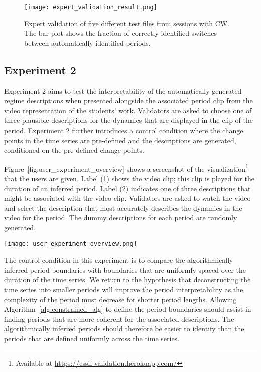 \begin{figure}
\centering
\texttt{[image: expert\_validation\_result.png]}
\caption{Expert validation of five different test files from sessions with CW. The bar plot shows the fraction of correctly identified switches between automatically identified periods.}
\label{fig:results_expert_validation}
\end{figure}

\subsection{Experiment 2}\label{sec:experiment2-empirical-validation}

Experiment 2 aims to test the interpretability of the automatically generated regime descriptions when presented alongside the associated period clip from the video representation of the students' work. Validators are asked to choose one of three plausible descriptions for the dynamics that are displayed in the clip of the period. Experiment 2 further introduces a control condition where the change points in the time series are pre-defined and the descriptions are generated, conditioned on the pre-defined change points.

Figure~\ref{fig:user_experiment_overview} shows a screenshot of the visualization\footnote{Available at \url{https://essil-validation.herokuapp.com/}} that the users are given. Label (1) shows the video clip; this clip is played for the duration of an inferred period. Label (2) indicates one of three descriptions that might be associated with the video clip. Validators are asked to watch the video and select the description that most accurately describes the dynamics in the video for the period. The dummy descriptions for each period are randomly generated.

\begin{sidewaysfigure}
\texttt{[image: user\_experiment\_overview.png]}
\caption{Screenshot of the user interface designed to evaluate the interpretability of Algorithm~\ref{alg:constrained_alg}. The video representation at (1) is played for the duration of the period. Three plausible descriptions (of which (2) is one of these) are presented and the validator is asked to select the description that best describes the dynamics shown in the video. In this case, \textit{Desciption 3} is the correct solution.}
\label{fig:user_experiment_overview}
\end{sidewaysfigure}

The control condition in this experiment is to compare the algorithmically inferred period boundaries with boundaries that are uniformly spaced over the duration of the time series. We return to the hypothesis that deconstructing the time series into smaller periods will improve the period interpretability as the complexity of the period must decrease for shorter period lengths. Allowing Algorithm~\ref{alg:constrained_alg} to define the period boundaries should assist in finding periods that are more coherent for the associated descriptions. The algorithmically inferred periods should therefore be easier to identify than the periods that are defined uniformly across the time series.

